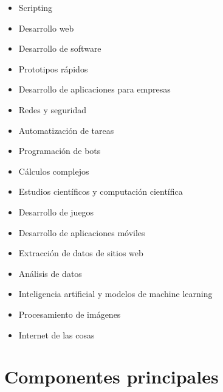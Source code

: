 \begin{itemize}
  \item Scripting
  
  \item Desarrollo web
  
  \item Desarrollo de software
  
  \item Prototipos rápidos
  
  \item Desarrollo de aplicaciones para empresas

  \item Redes y seguridad

  \item Automatización de tareas
  
  \item Programación de bots

  \item Cálculos complejos

  \item Estudios científicos y computación científica
  
  \item Desarrollo de juegos
  
  \item Desarrollo de aplicaciones móviles

  \item Extracción de datos de sitios web

  \item Análisis de datos

  \item Inteligencia artificial y modelos de machine learning

  \item Procesamiento de imágenes

  \item Internet de las cosas
  
\end{itemize}

\section{Componentes principales}

